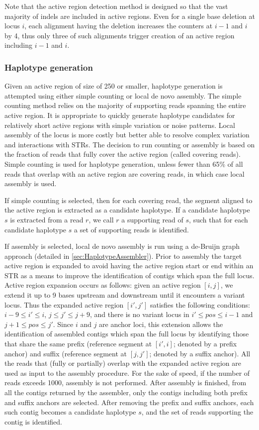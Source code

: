 \documentclass{article}
\begin{document}
Note that the active region detection method is designed so that the vast majority of indels are included in active regions. Even for a single base deletion at locus $i$, each alignment having the deletion increases the counters at $i-1$ and $i$ by 4, thus only three of such alignments trigger creation of an active region including $i-1$ and $i$.


\subsubsection{Haplotype generation}
Given an active region of size of 250 or smaller, haplotype generation is attempted using either simple counting or local de novo assembly. The simple counting method relies on the majority of supporting reads spanning the entire active region. It is appropriate to quickly generate haplotype candidates for relatively short active regions with simple variation or noise patterns. Local assembly of the locus is more costly but better able to resolve complex variation and interactions with STRs. The decision to run counting or assembly is based on the fraction of reads that fully cover the active region (called covering reads). Simple counting is used for haplotype generation, unless fewer than 65\% of all reads that overlap with an active region are covering reads, in which case local assembly is used.

If simple counting is selected, then for each covering read, the segment aligned to the active region is extracted as a candidate haplotype. If a candidate haplotype $s$ is extracted from a read $r$, we call $r$ a supporting read of $s$, such that for each candidate haplotype $s$ a set of supporting reads is identified.

If assembly is selected, local de novo assembly is run using a de-Bruijn graph approach (detailed in \ref{sec:HaplotypeAssembler}). Prior to assembly the target active region is expanded to avoid having the active region start or end within an STR as a means to improve the identification of contigs which span the full locus. Active region expansion occurs as follows: given an active region $[i,j]$, we extend it up to 9 bases upstream and downstream until it encounters a variant locus. Thus the expanded active region $[i',j']$ satisfies the following conditions: $i-9 \leq i' \leq i$, $j \leq j' \leq j+9$, and there is no variant locus in $i' \leq pos \leq i-1$ and $j+1 \leq pos \leq j'$. Since $i$ and $j$ are anchor loci, this extension allows the identification of assembled contigs which span the full locus by identifying those that share the same prefix (reference segment at $[i',i]$; denoted by a prefix anchor) and suffix (reference segment at $[j,j']$; denoted by a suffix anchor). All the reads that (fully or partially) overlap with the expanded active region are used as input to the assembly procedure. For the sake of speed, if the number of reads exceeds 1000, assembly is not performed. After assembly is finished, from all the contigs returned by the assembler, only the contigs including both prefix and suffix anchors are selected. After removing the prefix and suffix anchors, each such contig becomes a candidate haplotype $s$, and the set of reads supporting the contig is identified.
\end{document}
